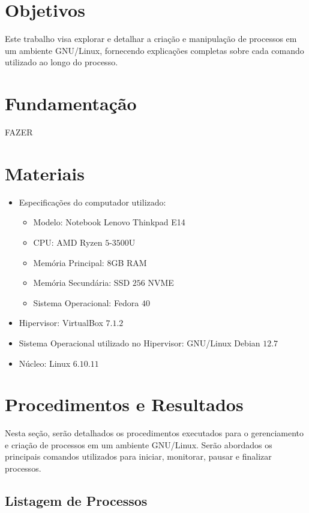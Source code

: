 \documentclass[
	12pt,				%
	oneside,   	        %
	a4paper,			%
	english,			%
	french,				%
	spanish,			%
	brazil,				%
	]{pacotes/abntex2}
\begin{document}
\section{Objetivos}
\label{sec:objetivos}

Este trabalho visa explorar e detalhar a criação e manipulação de processos em um ambiente GNU/Linux, fornecendo explicações completas sobre cada comando utilizado ao longo do processo.

\section{Fundamentação}
\label{sec:fundamentacao}

FAZER

\section{Materiais}
\label{sec:materiais}

\begin{itemize}
  \item Especificações do computador utilizado:
  \begin{itemize}
    \item Modelo: Notebook Lenovo Thinkpad E14
    \item CPU: AMD Ryzen $5$-$3500$U
    \item Memória Principal: $8$GB RAM
    \item Memória Secundária: SSD $256$ NVME
    \item Sistema Operacional: Fedora $40$
  \end{itemize}
  \item Hipervisor: VirtualBox $7.1.2$
  \item Sistema Operacional utilizado no Hipervisor: GNU/Linux Debian $12.7$
  \item Núcleo: Linux $6.10.11$
\end{itemize}

\section{Procedimentos e Resultados}
\label{sec:procedimentos}

Nesta seção, serão detalhados os procedimentos executados para o gerenciamento e criação de processos em um ambiente GNU/Linux. Serão abordados os principais comandos utilizados para iniciar, monitorar, pausar e finalizar processos.

\subsection{Listagem de Processos}
\label{subsec:proc}
\end{document}
